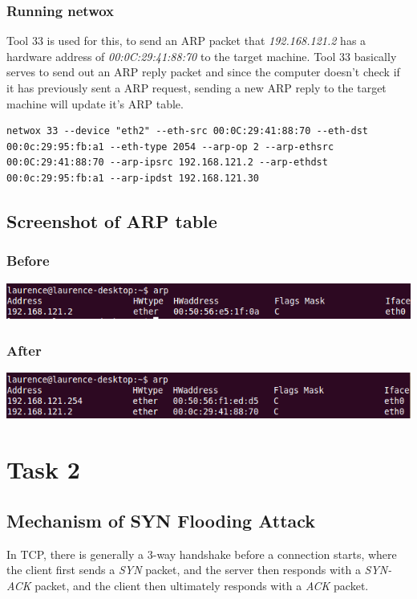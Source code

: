 \documentclass[12pt]{article}
\begin{document}
\subsubsection{Running netwox}
Tool 33 is used for this, to send an ARP packet that \emph{192.168.121.2} has a hardware address of \emph{00:0C:29:41:88:70} to the target machine. Tool 33 basically serves to send out an ARP reply packet and since the computer doesn't check if it has previously sent a ARP request, sending a new ARP reply to the target machine will update it's ARP table.\\

\begin{lstlisting}
netwox 33 --device "eth2" --eth-src 00:0C:29:41:88:70 --eth-dst 00:0c:29:95:fb:a1 --eth-type 2054 --arp-op 2 --arp-ethsrc 00:0C:29:41:88:70 --arp-ipsrc 192.168.121.2 --arp-ethdst 00:0c:29:95:fb:a1 --arp-ipdst 192.168.121.30
\end{lstlisting}


\subsection{Screenshot of ARP table}
\subsubsection{Before}
\includegraphics[width=160mm]{task11.png}

\subsubsection{After}
\includegraphics[width=160mm]{task12.png}
\pagebreak

\section{Task 2}
\subsection{Mechanism of SYN Flooding Attack}
In TCP, there is generally a 3-way handshake before a connection starts, where the client first sends a \emph{SYN} packet, and the server then responds with a \emph{SYN-ACK} packet, and the client then ultimately responds with a \emph{ACK} packet.\\
\end{document}
